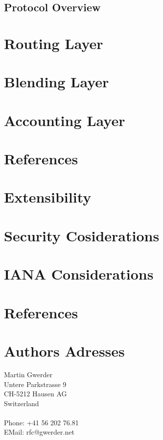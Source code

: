\documentclass[]{article}
\begin{document}
\subsection{Protocol Overview}

\section{Routing Layer}

\section{Blending Layer}

\section{Accounting Layer}

\section{References}

\section{Extensibility}

\section{Security Cosiderations}

\section{IANA Considerations}

\section{References}

	\printbibliography[title={},heading=none]%


\section*{Authors Adresses}

Martin Gwerder\\
Untere Parkstrasse 9\\
CH-5212 Hausen AG\\
Switzerland\\
~\\
Phone: +41 56 202 76.81\\
EMail: rfc@gwerder.net
\end{document}
